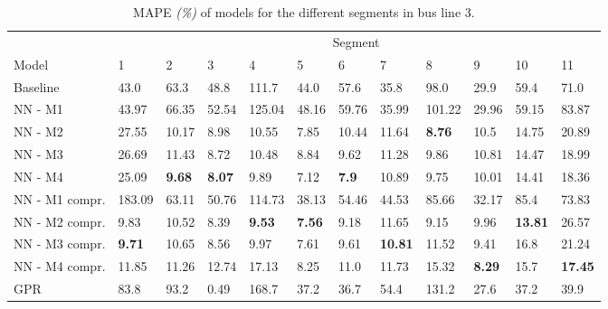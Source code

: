 \begin{table}[H]
  \centering
  \caption{MAPE \textit{(\%)} of models for the different segments in bus line 3.}
  \label{fig:model-mape-of-segs-203}
  \begin{adjustbox}{center}

    \begin{tabular}{l|l|l|l|l|l|l|l|l|l|l|l}
      & \multicolumn{11}{c}{Segment}                                                                                                                                                      \\
		Model          & 1             & 2             & 3             & 4             & 5             & 6            & 7              & 8             & 9             & 10             & 11               \\ 
		\hline
		Baseline       & 43.0          & 63.3          & 48.8          & 111.7         & 44.0          & 57.6         & 35.8           & 98.0          & 29.9          & 59.4           & 71.0             \\
		NN - M1        & 43.97         & 66.35         & 52.54         & 125.04        & 48.16         & 59.76        & 35.99          & 101.22        & 29.96         & 59.15          & 83.87            \\
		NN - M2        & 27.55         & 10.17         & 8.98          & 10.55         & 7.85          & 10.44        & 11.64          & \textbf{8.76} & 10.5          & 14.75          & 20.89            \\
		NN - M3        & 26.69         & 11.43         & 8.72          & 10.48         & 8.84          & 9.62         & 11.28          & 9.86          & 10.81         & 14.47          & 18.99            \\
		NN - M4        & 25.09         & \textbf{9.68} & \textbf{8.07} & 9.89          & 7.12          & \textbf{7.9} & 10.89          & 9.75          & 10.01         & 14.41          & 18.36            \\
		NN - M1 compr. & 183.09        & 63.11         & 50.76         & 114.73        & 38.13         & 54.46        & 44.53          & 85.66         & 32.17         & 85.4           & 73.83            \\
		NN - M2 compr. & 9.83          & 10.52         & 8.39          & \textbf{9.53} & \textbf{7.56} & 9.18         & 11.65          & 9.15          & 9.96          & \textbf{13.81} & 26.57            \\
		NN - M3 compr. & \textbf{9.71} & 10.65         & 8.56          & 9.97          & 7.61          & 9.61         & \textbf{10.81} & 11.52         & 9.41          & 16.8           & 21.24            \\
		NN - M4 compr. & 11.85         & 11.26         & 12.74         & 17.13         & 8.25          & 11.0         & 11.73          & 15.32         & \textbf{8.29} & 15.7           & \textbf{17.45 }  \\
	GPR         & 83.8 & 93.2 & 0.49 & 168.7 & 37.2 & 36.7 &  54.4 & 131.2 & 27.6 &37.2 & 39.9 \\
		\end{tabular}
\end{adjustbox}
\end{table}

